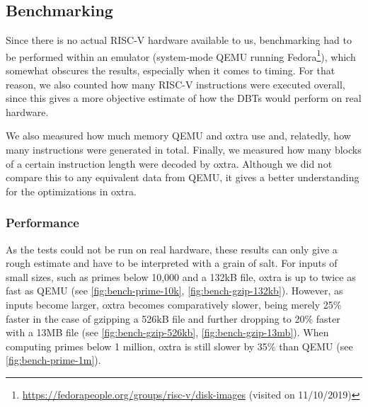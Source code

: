 \subsection{Benchmarking}
Since there is no actual RISC-V hardware available to us, benchmarking had to be performed within an emulator (system-mode QEMU running Fedora\footnote{\url{https://fedorapeople.org/groups/risc-v/disk-images} (visited on 11/10/2019)}), which somewhat obscures the results, especially when it comes to timing. For that reason, we also counted how many RISC-V instructions were executed overall, since this gives a more objective estimate of how the DBTs would perform on real hardware.

We also measured how much memory QEMU and oxtra use and, relatedly, how many instructions were generated in total. Finally, we measured how many blocks of a certain instruction length were decoded by oxtra. Although we did not compare this to any equivalent data from QEMU, it gives a better understanding for the optimizations in oxtra.

\subsubsection{Performance}
As the tests could not be run on real hardware, these results can only give a rough estimate and have to be interpreted with a grain of salt. For inputs of small sizes, such as primes below 10,000 and a 132kB file, oxtra is up to twice as fast as QEMU (see \autoref{fig:bench-prime-10k}, \autoref{fig:bench-gzip-132kb}). However, as inputs become larger, oxtra becomes comparatively slower, being merely 25\% faster in the case of gzipping a 526kB file and further dropping to 20\% faster with a 13MB file (see \autoref{fig:bench-gzip-526kb}, \autoref{fig:bench-gzip-13mb}). When computing primes below 1 million, oxtra is still slower by 35\% than QEMU (see \autoref{fig:bench-prime-1m}).


